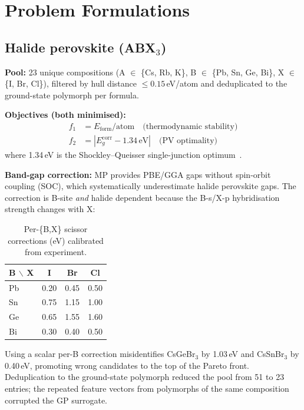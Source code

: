 \documentclass[10pt,twocolumn]{article}
\begin{document}
\section{Problem Formulations}

\subsection{Halide perovskite (ABX$_3$)}

\textbf{Pool:} 23 unique compositions (A $\in$ \{Cs, Rb, K\},
B $\in$ \{Pb, Sn, Ge, Bi\}, X $\in$ \{I, Br, Cl\}), filtered by
hull distance $\leq 0.15$\,eV/atom and deduplicated to the ground-state
polymorph per formula.

\textbf{Objectives (both minimised):}
\begin{align}
  f_1 &= E_\text{form}/\text{atom} \quad \text{(thermodynamic stability)} \\
  f_2 &= |E_g^\text{corr} - 1.34\,\text{eV}| \quad \text{(PV optimality)}
\end{align}
where 1.34\,eV is the Shockley--Queisser single-junction optimum~\cite{sq}.

\textbf{Band-gap correction:}
MP provides PBE/GGA gaps without spin-orbit coupling (SOC), which
systematically underestimate halide perovskite gaps.
The correction is B-site \emph{and} halide dependent because the
B-s/X-p hybridisation strength changes with X:

\begin{table}[h]
\centering
\caption{Per-\{B,X\} scissor corrections (eV) calibrated from experiment.}
\label{tab:scissor}
\begin{tabular}{lccc}
\toprule
B $\backslash$ X & I & Br & Cl \\
\midrule
Pb & 0.20 & 0.45 & 0.50 \\
Sn & 0.75 & 1.15 & 1.00 \\
Ge & 0.65 & 1.55 & 1.60 \\
Bi & 0.30 & 0.40 & 0.50 \\
\bottomrule
\end{tabular}
\end{table}

Using a scalar per-B correction misidentifies CsGeBr$_3$ by 1.03\,eV and
CsSnBr$_3$ by 0.40\,eV, promoting wrong candidates to the top of the
Pareto front.
Deduplication to the ground-state polymorph reduced the pool from 51 to 23
entries; the repeated feature vectors from polymorphs of the same composition
corrupted the GP surrogate.
\end{document}
